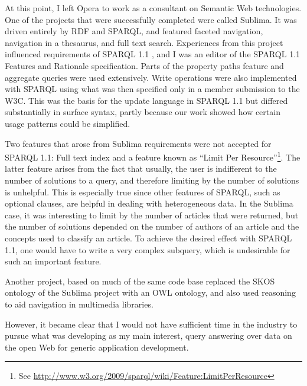 At this point, I left Opera to work as a consultant on Semantic Web
technologies. One of the projects that were successfully completed were
called Sublima\cite{sublima}. It was driven entirely by RDF and SPARQL,
and featured faceted navigation, navigation in a thesaurus, and full
text search. Experiences from this project influenced requirements of
SPARQL 1.1 \cite{sparql11query}, and I was an editor of the SPARQL 1.1 Features and
Rationale specification\cite{sparql11new}. Parts of the property paths
feature and aggregate queries were used extensively. Write operations
were also implemented with SPARQL using what was then specified only
in a member submission to the W3C\cite{seaborne2008sparql}. This was the basis for
the update language in SPARQL 1.1 but differed substantially in
surface syntax, partly because our work showed how certain usage patterns
could be simplified. 

Two features that arose from Sublima requirements were not accepted
for SPARQL 1.1: Full text index and a feature known as
``Limit Per Resource''\footnote{See
  \url{http://www.w3.org/2009/sparql/wiki/Feature:LimitPerResource}}. The
latter feature arises from the fact that usually, the user is
indifferent to the number of solutions to a query, and therefore
limiting by the number of solutions is unhelpful. This is especially
true since other features of SPARQL, such as optional clauses, are
helpful in dealing with heterogeneous data. In the Sublima case, it
was interesting to limit by the number of articles that were returned,
but the number of solutions depended on the number of authors of an
article and the concepts used to classify an article. To achieve the
desired effect with SPARQL 1.1, one would have to write a very complex
subquery, which is undesirable for such an important feature.


Another project, based on much of the same code
base replaced the SKOS ontology of the Sublima project with an OWL
ontology, and also used reasoning to aid navigation in multimedia
libraries.



However, it became clear that I would not have sufficient time in the
industry to pursue what was developing as my main interest, query
answering over data on the open Web for generic application
development. 

